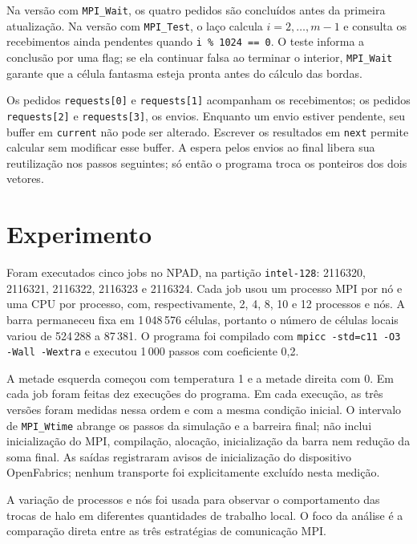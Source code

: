 \documentclass[11pt,letterpaper]{article}
\begin{document}
Na versão com \texttt{MPI\_Wait}, os quatro pedidos são concluídos antes da primeira atualização. Na versão com \texttt{MPI\_Test}, o laço calcula $i=2,\ldots,m-1$ e consulta os recebimentos ainda pendentes quando \texttt{i \% 1024 == 0}. O teste informa a conclusão por uma flag; se ela continuar falsa ao terminar o interior, \texttt{MPI\_Wait} garante que a célula fantasma esteja pronta antes do cálculo das bordas.

Os pedidos \texttt{requests[0]} e \texttt{requests[1]} acompanham os recebimentos; os pedidos \texttt{requests[2]} e \texttt{requests[3]}, os envios. Enquanto um envio estiver pendente, seu buffer em \texttt{current} não pode ser alterado. Escrever os resultados em \texttt{next} permite calcular sem modificar esse buffer. A espera pelos envios ao final libera sua reutilização nos passos seguintes; só então o programa troca os ponteiros dos dois vetores.

\section{Experimento}
Foram executados cinco jobs no NPAD, na partição \texttt{intel-128}: 2116320, 2116321, 2116322, 2116323 e 2116324. Cada job usou um processo MPI por nó e uma CPU por processo, com, respectivamente, 2, 4, 8, 10 e 12 processos e nós. A barra permaneceu fixa em 1\,048\,576 células, portanto o número de células locais variou de 524\,288 a 87\,381. O programa foi compilado com \texttt{mpicc -std=c11 -O3 -Wall -Wextra} e executou 1\,000 passos com coeficiente 0,2.

A metade esquerda começou com temperatura 1 e a metade direita com 0. Em cada job foram feitas dez execuções do programa. Em cada execução, as três versões foram medidas nessa ordem e com a mesma condição inicial. O intervalo de \texttt{MPI\_Wtime} abrange os passos da simulação e a barreira final; não inclui inicialização do MPI, compilação, alocação, inicialização da barra nem redução da soma final. As saídas registraram avisos de inicialização do dispositivo OpenFabrics; nenhum transporte foi explicitamente excluído nesta medição.

A variação de processos e nós foi usada para observar o comportamento das trocas de halo em diferentes quantidades de trabalho local. O foco da análise é a comparação direta entre as três estratégias de comunicação MPI.
\end{document}

